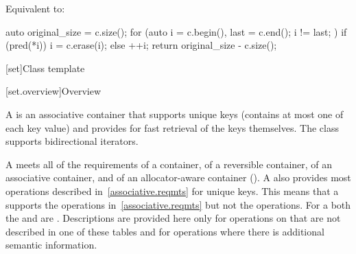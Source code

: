 \begin{itemdescr}
\pnum
\effects
Equivalent to:
\begin{codeblock}
auto original_size = c.size();
for (auto i = c.begin(), last = c.end(); i != last; ) {
  if (pred(*i)) {
    i = c.erase(i);
  } else {
    ++i;
  }
}
return original_size - c.size();
\end{codeblock}
\end{itemdescr}

[set]{Class template }

[set.overview]{Overview}

\pnum
{}%
A
is an associative container that supports unique keys (contains at most one of each key value) and
provides for fast retrieval of the keys themselves.
The
 class
supports bidirectional iterators.

\pnum
A  meets all of the requirements of a container, of a reversible
container, of an associative
container, and of an allocator-aware container
().
A
also provides most operations described in~\ref{associative.reqmts}
for unique keys.
This means that a
supports the
operations in~\ref{associative.reqmts}
but not the
operations.
For a
both the
and
are
.
Descriptions are provided here only for operations on
that are not described in one of these tables
and for operations where there is additional semantic information.

